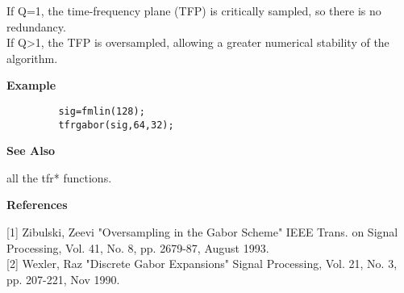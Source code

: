 \newpage

\hspace*{1.5cm}
\begin{minipage}[t]{13.5cm}
If {\ty Q=1}, the time-frequency plane (TFP) is critically sampled, so
there is no redundancy.\\
If {\ty Q>1}, the TFP is oversampled, allowing a greater numerical
stability of the algorithm. \\

\end{minipage}
\vspace*{1cm}

{\bf \large \sf Example}
\begin{verbatim}
         sig=fmlin(128); 
         tfrgabor(sig,64,32); 
\end{verbatim}
\vspace*{.5cm}

{\bf \large \sf See Also}\\
\hspace*{1.5cm}
\begin{minipage}[t]{13.5cm}
all the {\ty tfr*} functions.
\end{minipage}
\vspace*{.5cm}


{\bf \large \sf References}\\
\hspace*{1.5cm}
\begin{minipage}[t]{13.5cm}
[1] Zibulski, Zeevi "Oversampling in the Gabor Scheme" IEEE Trans. on
	    Signal Processing, Vol. 41, No. 8, pp. 2679-87, August 1993.\\ 

[2] Wexler, Raz "Discrete Gabor Expansions" Signal Processing, Vol. 21, No.
	    3, pp. 207-221, Nov 1990.

\end{minipage}
